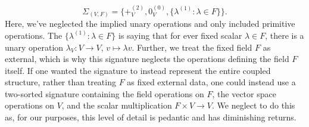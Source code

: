 \[
    \Sigma_{(V, F)} = \{+_V^{(2)}, 0_V^{(0)}, \{\lambda^{(1)}:\lambda\in F\}\}.
\]
Here, we've neglected the implied unary operations and only included primitive operations. The $\{\lambda^{(1)}:\lambda \in F\}$ is saying that for ever fixed scalar $\lambda\in F$, there is a unary operation $\lambda_V:V\rightarrow V$, $v\mapsto \lambda v$. Further, we treat the fixed field $F$ as external, which is why this signature neglects the operations defining the field $F$ itself. If one wanted the signature to instead represent the entire coupled structure, rather than treating $F$ as fixed external data, one could instead use a two-sorted signature containing the field operations on $F$, the vector space operations on $V$, and the scalar multiplication $F\times V\rightarrow V$. We neglect to do this as, for our purposes, this level of detail is pedantic and has diminishing returns.

